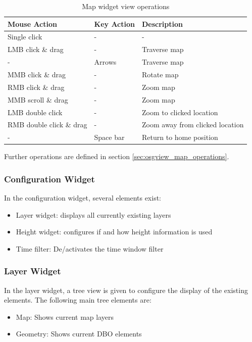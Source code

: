 \documentclass[10pt,letterpaper,extrafontsizes]{memoir}
\begin{document}
\begin{table}[H]
  \center
  \begin{tabular}{ | l | l | l |}
    \hline
    \textbf{Mouse Action} & \textbf{Key Action} &  \textbf{Description} \\ \hline
    Single click & - & - \\ \hline
    LMB click \& drag & - & Traverse map \\ \hline
    - & Arrows & Traverse map \\ \hline
    MMB click \& drag & - & Rotate map \\ \hline
    RMB click \& drag & - & Zoom map \\ \hline
    MMB scroll \& drag & - & Zoom map \\ \hline
    LMB double click & - & Zoom to clicked location \\ \hline
    RMB double click \& drag & - & Zoom away from clicked location \\ \hline
    - & Space bar & Return to home position \\ \hline
  \end{tabular}
  \caption{Map widget view operations}
\end{table}

Further operations are defined in section \ref{sec:osgview_map_operations}.

\subsubsection{Configuration Widget}
\label{sec:osgview_config}

In the configuration widget, several elements exist:

\begin{itemize}
 \item Layer widget: displays all currently existing layers
 \item Height widget: configures if and how height information is used
 \item Time filter: De/activates the time window filter
\end{itemize}

\subsubsection{Layer Widget}

In the layer widget, a tree view is given to configure the display of the existing elements. The following main tree elements are:
\begin{itemize}
 \item Map: Shows current map layers
 \item Geometry: Shows current DBO elements
\end{itemize}
\end{document}
